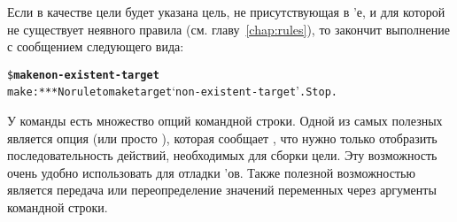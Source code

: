 Если в качестве цели будет указана цель, не присутствующая в
\Makefile{}'е, и для которой не существует неявного правила (см.
главу~\ref{chap:rules}), то \GNUmake{} закончит выполнение с
сообщением следующего вида:

{\footnotesize
\begin{alltt}
\$ \textbf{make non-existent-target}
make: *** No rule to make target `non-existent-target'. Stop.
\end{alltt}
}

У команды \GNUmake{} есть множество опций командной строки. Одной из
самых полезных является опция  (или просто
), которая сообщает \GNUmake{}, что нужно только отобразить
последовательность действий, необходимых для сборки цели. Эту
возможность очень удобно использовать для отладки \Makefile{}'ов.
Также полезной возможностью является передача или переопределение
значений переменных \GNUmake{} через аргументы командной строки.
